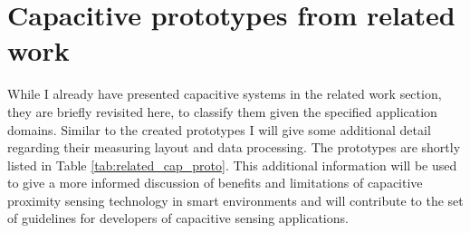 \section{Capacitive prototypes from related work}
While I already have presented capacitive systems in the related work section, they are briefly revisited here, to classify them given the specified application domains. Similar to the created prototypes I will give some additional detail regarding their measuring layout and data processing. The prototypes are shortly listed in Table \ref{tab:related_cap_proto}. This additional information will be used to give a more informed discussion of benefits and limitations of capacitive proximity sensing technology in smart environments and will contribute to the set of guidelines for developers of capacitive sensing applications.

